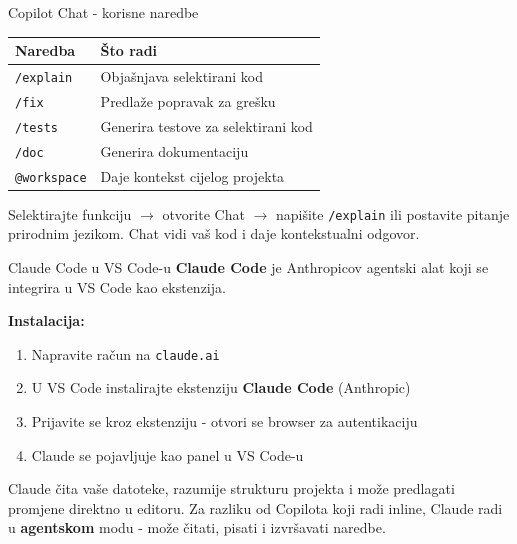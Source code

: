 \begin{frame}{Copilot Chat - korisne naredbe}
\begin{tabular}{@{}ll@{}}
  \toprule
  \textbf{Naredba} & \textbf{Što radi} \\
  \midrule
  \texttt{/explain} & Objašnjava selektirani kod \\
  \texttt{/fix} & Predlaže popravak za grešku \\
  \texttt{/tests} & Generira testove za selektirani kod \\
  \texttt{/doc} & Generira dokumentaciju \\
  \texttt{@workspace} & Daje kontekst cijelog projekta \\
  \bottomrule
\end{tabular}

\vspace{0.6em}
Selektirajte funkciju $\rightarrow$ otvorite Chat $\rightarrow$ napišite \texttt{/explain} ili postavite pitanje prirodnim jezikom. Chat vidi vaš kod i daje kontekstualni odgovor.
\end{frame}

\begin{frame}{Claude Code u VS Code-u}
\textbf{Claude Code} je Anthropicov agentski alat koji se integrira u VS Code kao ekstenzija.

\vspace{0.4em}
\textbf{Instalacija:}
\begin{enumerate}
  \item Napravite račun na \texttt{claude.ai}
  \item U VS Code instalirajte ekstenziju \textbf{Claude Code} (Anthropic)
  \item Prijavite se kroz ekstenziju - otvori se browser za autentikaciju
  \item Claude se pojavljuje kao panel u VS Code-u
\end{enumerate}

\vspace{0.6em}
Claude čita vaše datoteke, razumije strukturu projekta i može predlagati promjene direktno u editoru. Za razliku od Copilota koji radi inline, Claude radi u \textbf{agentskom} modu - može čitati, pisati i izvršavati naredbe.
\end{frame}

